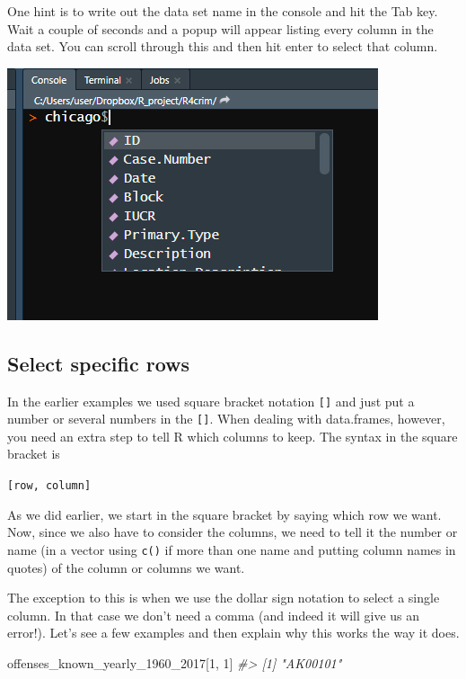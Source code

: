 \documentclass[
  12pt,
  openany]{book}
\newenvironment{Shaded}{\begin{snugshade}}{\end{snugshade}}
\newcommand{\CommentTok}[1]{\textcolor[rgb]{0.37,0.37,0.37}{\textit{#1}}}
\newcommand{\DecValTok}[1]{\textcolor[rgb]{0.06,0.06,0.06}{#1}}
\newcommand{\NormalTok}[1]{#1}
\begin{document}
One hint is to write out the data set name in the console and hit the Tab key. Wait a couple of seconds and a popup will appear listing every column in the data set. You can scroll through this and then hit enter to select that column.

\includegraphics{images/tab_example.png}

\hypertarget{select-specific-rows}{%
\subsection{Select specific rows}\label{select-specific-rows}}

In the earlier examples we used square bracket notation \texttt{{[}{]}} and just put a number or several numbers in the \texttt{{[}{]}}. When dealing with data.frames, however, you need an extra step to tell R which columns to keep. The syntax in the square bracket is

\texttt{{[}row,\ column{]}}

As we did earlier, we start in the square bracket by saying which row we want. Now, since we also have to consider the columns, we need to tell it the number or name (in a vector using \texttt{c()} if more than one name and putting column names in quotes) of the column or columns we want.

The exception to this is when we use the dollar sign notation to select a single column. In that case we don't need a comma (and indeed it will give us an error!). Let's see a few examples and then explain why this works the way it does.

\begin{Shaded}
\begin{Highlighting}[]
\NormalTok{offenses\_known\_yearly\_1960\_2017[}\DecValTok{1}\NormalTok{, }\DecValTok{1}\NormalTok{]}
\CommentTok{\#\textgreater{} [1] "AK00101"}
\end{Highlighting}
\end{Shaded}
\end{document}
